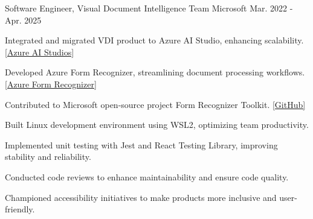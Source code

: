 

\begin{cventries}

  \cventry
    {Software Engineer, Visual Document Intelligence Team} %
    {\color{gray}Microsoft} 
    {}
    {Mar. 2022 - Apr. 2025} %
    {
      \begin{cvitems} %
        \item {Integrated and migrated VDI product to Azure AI Studio, enhancing scalability.} \href{https://azure.microsoft.com/en-us/products/ai-studio/}{\color{ao}[Azure AI Studios]}
        \item {Developed Azure Form Recognizer, streamlining document processing workflows.} \href{https://azure.microsoft.com/en-us/products/form-recognizer/}{\color{ao}[Azure Form Recognizer]}
        \item {Contributed to Microsoft open-source project Form Recognizer Toolkit. \href{https://github.com/microsoft/Form-Recognizer-Toolkit}{\color{ao}[GitHub]}}
        \item {Built Linux development environment using WSL2, optimizing team productivity.}
        \item {Implemented unit testing with Jest and React Testing Library, improving stability and reliability.}
        \item {Conducted code reviews to enhance maintainability and ensure code quality.}
        \item {Championed accessibility initiatives to make products more inclusive and user-friendly.
}
      \end{cvitems}
    }
\end{cventries}
